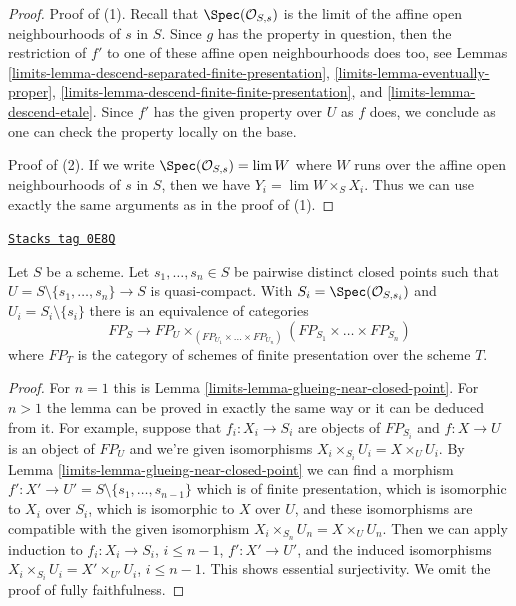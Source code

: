 \begin{proof}

Proof of (1). Recall that $\Spec(\mathcal{O}_{S, s})$ is the limit of the
affine open neighbourhoods of $s$ in $S$. Since $g$ has the property
in question, then the restriction of $f'$ to one of these
affine open neighbourhoods does too, see
Lemmas \ref{limits-lemma-descend-separated-finite-presentation},
\ref{limits-lemma-eventually-proper},
\ref{limits-lemma-descend-finite-finite-presentation}, and
\ref{limits-lemma-descend-etale}.
Since $f'$ has the given property over $U$ as $f$ does,
we conclude as one can check the property locally on the base.

\medskip\noindent
Proof of (2). If we write $\Spec(\mathcal{O}_{S, s}) = \lim W$
where $W$ runs over the affine open neighbourhoods of $s$ in $S$,
then we have $Y_i = \lim W \times_S X_i$. Thus we can use
exactly the same arguments as in the proof of (1).
\end{proof}

\begin{lemma}
\label{limits-lemma-glueing-near-multiple-closed-points}
\href{https://stacks.math.columbia.edu/tag/0E8Q}{\texttt{Stacks tag 0E8Q}}

Let $S$ be a scheme. Let $s_1, \ldots, s_n \in S$ be pairwise distinct
closed points such that
$U = S \setminus \{s_1, \ldots, s_n\} \to S$ is quasi-compact. With
$S_i = \Spec(\mathcal{O}_{S, s_i})$ and $U_i = S_i \setminus \{s_i\}$
there is an equivalence of categories
$$
FP_S \longrightarrow
FP_U \times_{(FP_{U_1} \times \ldots \times FP_{U_n})}
(FP_{S_1} \times \ldots \times FP_{S_n})
$$
where $FP_T$ is the category of schemes of finite presentation over
the scheme $T$.
\end{lemma}

\begin{proof}

For $n = 1$ this is Lemma \ref{limits-lemma-glueing-near-closed-point}.
For $n > 1$ the lemma can be proved in exactly the same way or it
can be deduced from it. For example, suppose that $f_i : X_i \to S_i$
are objects of $FP_{S_i}$ and $f : X \to U$ is an object
of $FP_U$ and we're given isomorphisms $X_i \times_{S_i} U_i = X \times_U U_i$.
By Lemma \ref{limits-lemma-glueing-near-closed-point} we can find
a morphism $f' : X' \to U' = S \setminus \{s_1, \ldots, s_{n - 1}\}$
which is of finite presentation, which is isomorphic to
$X_i$ over $S_i$, which is isomorphic to $X$ over $U$, and
these isomorphisms are compatible with the given isomorphism
$X_i \times_{S_n} U_n = X \times_U U_n$.
Then we can apply induction to
$f_i : X_i \to S_i$, $i \leq n - 1$,
$f' : X' \to U'$, and the induced
isomorphisms $X_i \times_{S_i} U_i = X' \times_{U'} U_i$, $i \leq n - 1$.
This shows essential surjectivity. We omit the proof of
fully faithfulness.
\end{proof}

